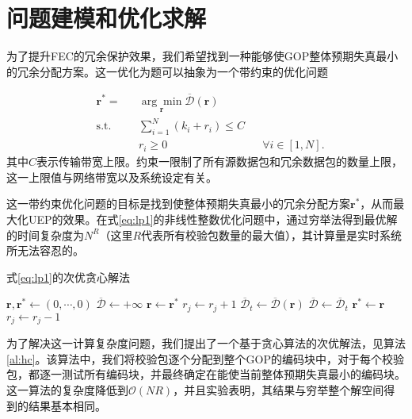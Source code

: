 \section{问题建模和优化求解}
为了提升FEC的冗余保护效果，我们希望找到一种能够使GOP整体预期失真最小的冗余分配方案。这一优化为题可以抽象为一个带约束的优化问题

\begin{equation}
\label{eq:lp1}
\begin{aligned}
& \mathbf{r}^{*} =
& & \underset{\mathbf{r}}{\arg\min} \overline{\mathcal{D}}(\mathbf{r}) \\
& \text{s.t.}
& & \sum_{i=1}^{N}(k_i + r_i) \le C \\
&&& r_i \ge 0 &{} &\forall i \in [1,N].
\end{aligned}
\end{equation}
其中$C$表示传输带宽上限。约束一限制了所有源数据包和冗余数据包的数量上限，这一上限值与网络带宽以及系统设定有关。

这一带约束优化问题的目标是找到使整体预期失真最小的冗余分配方案$\mathbf{r}^{*}$，从而最大化UEP的效果。在式\ref{eq:lp1}的非线性整数优化问题中，通过穷举法得到最优解的时间复杂度为$N^{R}$（这里$R$代表所有校验包数量的最大值），其计算量是实时系统所无法容忍的。

\begin{algorithm}[htbp]
\caption{式\ref{eq:lp1}的次优贪心解法}
\label{al:hc}
    \begin{algorithmic}
    \State $\mathbf{r}, \mathbf{r}^{*} \gets (0,\cdots,0)$
    \State $\overline{\mathcal{D}} \gets +\infty$
        \State $\mathbf{r} \gets \mathbf{r}^{*}$
            \State $r_j \gets r_j + 1$
            \State $\overline{\mathcal{D}}_{t} \gets \overline{\mathcal{D}}(\mathbf{r})$
                \State $\overline{\mathcal{D}} \gets \overline{\mathcal{D}}_{t}$
                \State $\mathbf{r}^{*} \gets \mathbf{r}$
            \EndIf
            \State $r_j \gets r_j - 1$
        \EndFor
    \EndFor
    \end{algorithmic}
\end{algorithm}

为了解决这一计算复杂度问题，我们提出了一个基于贪心算法的次优解法，见算法 \ref{al:hc}。该算法中，我们将校验包逐个分配到整个GOP的编码块中，对于每个校验包，都逐一测试所有编码块，并最终确定在能使当前整体预期失真最小的编码块。这一算法的复杂度降低到$\mathcal{O}(NR)$，并且实验表明，其结果与穷举整个解空间得到的结果基本相同。

